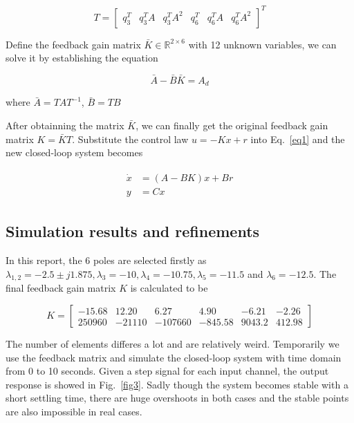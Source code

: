 \documentclass[hyperref]{article}
\theoremstyle{nonumberplain}
\begin{document}
	\begin{equation}
	T=\begin{bmatrix}
	q_{3}^{T} &q_{3}^{T}A  &q_{3}^{T}A^{2}  & q_{6}^{T} &q_{6}^{T}A  &q_{6}^{T}A^{2}
	\end{bmatrix}^{T}
	\label{eq13}
	\end{equation}
	
	Define the feedback gain matrix $\bar{K}\in \mathbb{R}^{2\times 6}$ with 12 unknown variables, we can solve it by establishing the equation
	
	\begin{equation}
	\bar{A}-\bar{B}\bar{K}=A_{d}
	\label{eq14}
	\end{equation}
	
	where $\bar{A}=TAT^{-1}$, $\bar{B}=TB$
	
	After obtainning the matrix $\bar{K}$, we can finally get the original feedback gain matrix $K=\bar{K}T$. Substitute the control law $u=-Kx+r$ into Eq.~\ref{eq1} and the new closed-loop system becomes
	
	\begin{equation}
	\begin{split}
	\begin{aligned}
	\dot{x}&=(A-BK)x+Br \\
	y&=Cx
	\label{eq15}
	\end{aligned}
	\end{split}
	\end{equation}
	
	
	\subsection{Simulation results and refinements}
	
	\hspace{1.0em}
	In this report, the 6 poles are selected firstly as $\lambda_{1,2}=-2.5\pm j1.875, \lambda_{3}=-10, \lambda_{4}=-10.75, \lambda_{5}=-11.5$ and $\lambda_{6}=-12.5$. The final feedback gain matrix $K$ is calculated to be
	
	\begin{equation}
	K=\begin{bmatrix}
	-15.68 &12.20  &6.27  &4.90  &-6.21  &-2.26 \\ 
	250960 &-21110  &-107660  &-845.58  &9043.2  &412.98 
	\end{bmatrix}
	\nonumber
	\end{equation}
	
	The number of elements differes a lot and are relatively weird. Temporarily we use the feedback matrix and simulate the closed-loop system with time domain from 0 to 10 seconds. Given a step signal for each input channel, the output response is showed in Fig.~\ref{fig3}. Sadly though the system becomes stable with a short settling time, there are huge overshoots in both cases and the stable points are also impossible in real cases. 
	
\end{document}
